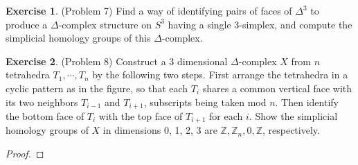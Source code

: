 \documentclass[12pt, psamsfonts]{amsart}
\theoremstyle{definition}
\newtheorem*{exer}{Exercise}
\theoremstyle{remark}
\numberwithin{equation}{section}
\begin{document}
\begin{exer}{(Problem 7)}
  Find a way of identifying pairs of faces of $\Delta^3$ to produce a $\Delta$-complex structure on $S^3$ having a single 3-simplex, and compute the simplicial homology groups of this $\Delta$-complex.
\end{exer}

\begin{exer}{(Problem 8)}
  Construct a 3 dimensional $\Delta$-complex $X$ from $n$ tetrahedra $T_1, \cdots, T_n$ by the following two steps.
  First arrange the tetrahedra in a cyclic pattern as in the figure, so that each $T_i$ shares a common vertical face with its two neighbors $T_{i - 1}$ and $T_{i + 1}$, subscripts being taken mod $n$.
  Then identify the bottom face of $T_i$ with the top face of $T_{i + 1}$ for each $i$.
  Show the simplicial homology groups of $X$ in dimensions 0, 1, 2, 3 are $\mathbb{Z}, \mathbb{Z}_n, 0, \mathbb{Z}$, respectively.
\end{exer}

\begin{proof}
\end{proof}
\end{document}
